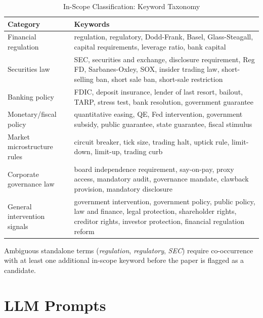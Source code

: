 \documentclass[12pt]{article}
\begin{document}
\begin{table}[H]
\centering
\caption{In-Scope Classification: Keyword \mbox{Taxonomy}}
\label{tab:keywords}
\small
\renewcommand{\arraystretch}{1.15}
\begin{tabular}{@{}p{3.8cm}p{10cm}@{}}
\toprule
\textbf{Category} & \textbf{Keywords} \\
\midrule
Financial regulation &
  regulation, regulatory, Dodd-Frank, Basel, Glass-Steagall,
  capital requirements, leverage ratio, bank capital \\
\addlinespace[3pt]
Securities law &
  SEC, securities and exchange, disclosure requirement, Reg FD,
  Sarbanes-Oxley, SOX, insider trading law, short-selling ban,
  short sale ban, short-sale restriction \\
\addlinespace[3pt]
Banking policy &
  FDIC, deposit insurance, lender of last resort, bailout, TARP,
  stress test, bank resolution, government guarantee \\
\addlinespace[3pt]
Monetary/fiscal policy &
  quantitative easing, QE, Fed intervention, government subsidy,
  public guarantee, state guarantee, fiscal stimulus \\
\addlinespace[3pt]
Market microstructure rules &
  circuit breaker, tick size, trading halt, uptick rule,
  limit-down, limit-up, trading curb \\
\addlinespace[3pt]
Corporate governance law &
  board independence requirement, say-on-pay, proxy access,
  mandatory audit, governance mandate, clawback provision,
  mandatory disclosure \\
\addlinespace[3pt]
General intervention signals &
  government intervention, government policy, public policy,
  law and finance, legal protection, shareholder rights,
  creditor rights, investor protection, financial regulation reform \\
\bottomrule
\end{tabular}
\end{table}

\noindent Ambiguous standalone terms (\textit{regulation}, \textit{regulatory},
\textit{SEC}) require co-occurrence with at least one additional in-scope
keyword before the paper is flagged as a candidate.



\section{LLM Prompts}
\end{document}
